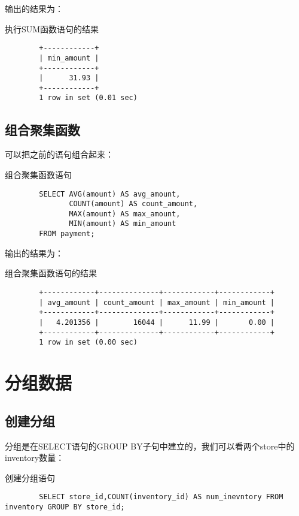 \documentclass[UTF8]{article}
\begin{document}
输出的结果为：

\begin{listing}[H]
	\caption{执行SUM函数语句的结果}
	\label{code:combinationaggregatefunctionclauseresult}
\begin{verbatim}
        +------------+
        | min_amount |
        +------------+
        |      31.93 |
        +------------+
        1 row in set (0.01 sec)
\end{verbatim}
\end{listing}

\subsection{组合聚集函数}

可以把之前的语句组合起来：

\begin{listing}[H]
	\caption{组合聚集函数语句}
	\label{code:combinationaggregatefunctionclause}
\begin{verbatim}
        SELECT AVG(amount) AS avg_amount,
               COUNT(amount) AS count_amount,
               MAX(amount) AS max_amount,
               MIN(amount) AS min_amount
        FROM payment;
\end{verbatim}
\end{listing}

输出的结果为：

\begin{listing}[H]
	\caption{组合聚集函数语句的结果}
	\label{code:sumfunctionclauseresult}
\begin{verbatim}
        +------------+--------------+------------+------------+
        | avg_amount | count_amount | max_amount | min_amount |
        +------------+--------------+------------+------------+
        |   4.201356 |        16044 |      11.99 |       0.00 |
        +------------+--------------+------------+------------+
        1 row in set (0.00 sec)
\end{verbatim}
\end{listing}

\section{分组数据}
\subsection{创建分组}

分组是在SELECT语句的GROUP BY子句中建立的，我们可以看两个store中的inventory数量：
\begin{listing}[H]
	\caption{创建分组语句}
	\label{code:setgroupclause}
\begin{verbatim}
        SELECT store_id,COUNT(inventory_id) AS num_inevntory FROM inventory GROUP BY store_id;
\end{verbatim}
\end{listing}
\end{document}
